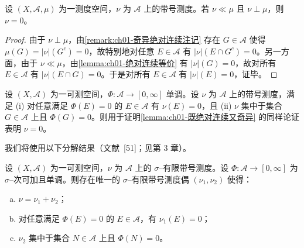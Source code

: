 \documentclass[../../main.tex]{subfiles}%
\begin{document}
\begin{lemma}\label{lemma:ch01-既绝对连续又奇异}
设 $(X,\mathcal{A},\mu)$ 为一测度空间，$\nu$ 为 $\mathcal{A}$ 上的带号测度。若 $\nu\ll\mu$ 且 $\nu\perp\mu$，则 $\nu=0$。
\end{lemma}

\begin{proof}
由于 $\nu\perp\mu$，由\cref{remark:ch01-奇异绝对连续注记} 存在 $G\in\mathcal{A}$ 使得 $\mu(G)=|\nu|(G^c)=0$，故特别地对任意 $E\in\mathcal{A}$ 有 $|\nu|(E\cap G^c)=0$。另一方面，由于 $\nu\ll\mu$，由\cref{lemma:ch01-绝对连续等价} 有 $|\nu|(G)=0$，故对所有 $E\in\mathcal{A}$ 有 $|\nu|(E\cap G)=0$。于是对所有 $E\in\mathcal{A}$ 有 $|\nu|(E)=0$，证毕。
\end{proof}

\begin{remark}\label{remark:ch01-集中于零容量}
设 $(X,\mathcal{A})$ 为一可测空间，$\Phi:\mathcal{A}\to[0,\infty]$ 单调。设 $\nu$ 为 $\mathcal{A}$ 上的带号测度，满足 (i) 对任意满足 $\Phi(E)=0$ 的 $E\in\mathcal{A}$ 有 $\nu(E)=0$，且 (ii) $\nu$ 集中于集合 $G\in\mathcal{A}$ 上且 $\Phi(G)=0$。则用于证明\cref{lemma:ch01-既绝对连续又奇异} 的同样论证表明 $\nu=0$。
\end{remark}

我们将使用以下分解结果（文献~[51]；见第 3 章）。

\begin{proposition}\label{proposition:ch01-FST分解}
设 $(X,\mathcal{A})$ 为一可测空间，$\nu$ 为 $\mathcal{A}$ 上的 $\sigma$--有限带号测度。设 $\Phi:\mathcal{A}\to[0,\infty]$ 为 $\sigma$--次可加且单调。则存在唯一的 $\sigma$--有限带号测度偶 $(\nu_1,\nu_2)$ 使得：
\begin{enumerate}[(a)]
\item $\nu=\nu_1+\nu_2$；
\item 对任意满足 $\Phi(E)=0$ 的 $E\in\mathcal{A}$，有 $\nu_1(E)=0$；
\item $\nu_2$ 集中于集合 $N\in\mathcal{A}$ 上且 $\Phi(N)=0$。
\end{enumerate}
\end{proposition}
\end{document}
